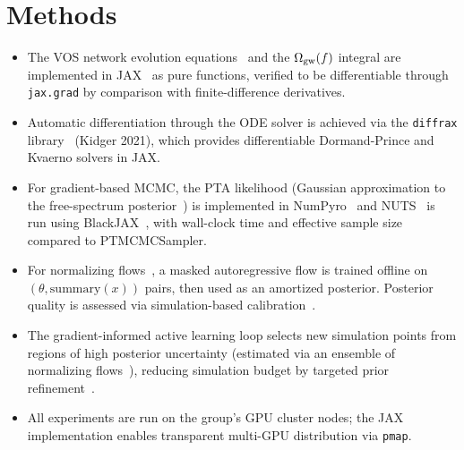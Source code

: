 \section{Methods}\label{sec:5-methods}
\begin{itemize}
    \item The VOS network evolution equations~\cite{martins_extending_2002} and the $\Omega_{\rm gw}(f)$ integral are implemented in JAX~\cite{bradbury_jax_2018} as pure functions, verified to be differentiable through \texttt{jax.grad} by comparison with finite-difference derivatives.
    \item Automatic differentiation through the ODE solver is achieved via the \texttt{diffrax} library~\cite{kidger_neural_2022} (Kidger 2021), which provides differentiable Dormand-Prince and Kvaerno solvers in JAX.
    \item For gradient-based MCMC, the PTA likelihood (Gaussian approximation to the free-spectrum posterior~\cite{johnson_nanograv_2024}) is implemented in NumPyro~\cite{phan_composable_2019} and NUTS~\cite{hoffman_nuts_2014} is run using BlackJAX~\cite{cabezas_blackjax_2024}, with wall-clock time and effective sample size compared to PTMCMCSampler.
    \item For normalizing flows~\cite{papamakarios_normalizing_2021}, a masked autoregressive flow is trained offline on $(\theta, \text{summary}(x))$ pairs, then used as an amortized posterior. Posterior quality is assessed via simulation-based calibration~\cite{talts_validating_2018}.
    \item The gradient-informed active learning loop selects new simulation points from regions of high posterior uncertainty (estimated via an ensemble of normalizing flows~\cite{papamakarios_normalizing_2021}), reducing simulation budget by targeted prior refinement~\cite{cranmer_frontier_2020}.
    \item All experiments are run on the group's GPU cluster nodes; the JAX~\cite{bradbury_jax_2018} implementation enables transparent multi-GPU distribution via \texttt{pmap}.
\end{itemize}